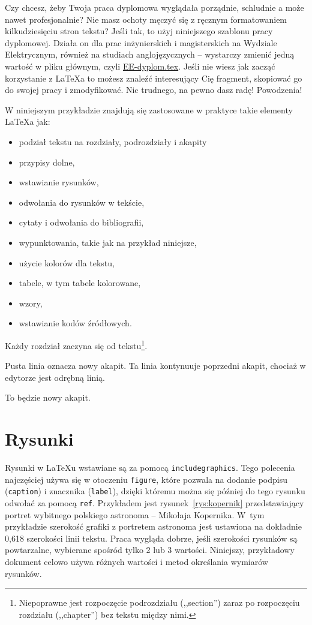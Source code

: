 Czy chcesz, żeby Twoja praca dyplomowa wyglądała porządnie, schludnie a może nawet profesjonalnie? Nie masz ochoty męczyć się z ręcznym formatowaniem kilkudziesięciu stron tekstu? Jeśli tak, to użyj niniejszego szablonu pracy dyplomowej. Działa on dla prac inżynierskich i magisterskich na Wydziale Elektrycznym, również na studiach anglojęzycznych -- wystarczy zmienić jedną wartość w pliku głównym, czyli \href{./EE-dyplom.tex}{EE-dyplom.tex}. Jeśli nie wiesz jak zacząć korzystanie z \LaTeX{a} to możesz znaleźć interesujący Cię fragment, skopiować go do swojej pracy i zmodyfikować. Nic trudnego, na pewno dasz radę! Powodzenia!

W niniejszym przykładzie znajdują się zastosowane w praktyce takie elementy \LaTeX{a} jak:
\begin{itemize}
	\item podział tekstu na rozdziały, podrozdziały i akapity
	\item przypisy dolne,
	\item wstawianie rysunków,
	\item odwołania do rysunków w tekście,
	\item cytaty i odwołania do bibliografii,
	\item wypunktowania, takie jak na przykład niniejsze,
	\item użycie kolorów dla tekstu,
	\item tabele, w tym tabele kolorowane, %
	\item wzory, %
	\item wstawianie kodów źródłowych.
\end{itemize}

Każdy rozdział zaczyna się od tekstu\footnote{Niepoprawne jest rozpoczęcie podrozdziału (,,section'') zaraz po rozpoczęciu rozdziału (,,chapter'') bez tekstu między nimi.}.

Pusta linia oznacza nowy akapit.
Ta linia kontynuuje poprzedni akapit, chociaż w edytorze jest odrębną linią.

To będzie nowy akapit.

\section{Rysunki}
Rysunki w \LaTeX{u} wstawiane są za pomocą \texttt{includegraphics}. Tego polecenia najczęściej używa się w otoczeniu \texttt{figure}, które pozwala na dodanie podpisu (\texttt{caption}) i znacznika (\texttt{label}), dzięki któremu można się później do tego rysunku odwołać za pomocą \texttt{ref}. Przykładem jest rysunek~\ref{rys:kopernik} przedstawiający portret wybitnego polskiego astronoma -- Mikołaja Kopernika. W~tym przykładzie szerokość grafiki z portretem astronoma jest ustawiona na dokładnie 0,618 szerokości linii tekstu. Praca wygląda dobrze, jeśli szerokości rysunków są powtarzalne, wybierane spośród tylko 2 lub 3 wartości. Niniejszy, przykładowy dokument celowo używa różnych wartości i metod określania wymiarów rysunków.

